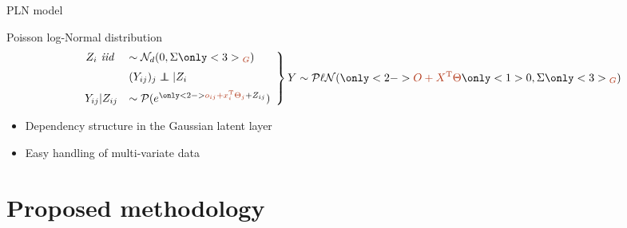 \documentclass[11pt]{beamer}
\newcommand{\emphase}[1]{\textcolor{Complement}{#1}}
\newcommand\independent{\protect\mathpalette{\protect\independenT}{\perp}}\def\independenT#1#2{\mathrel{\rlap{$#1#2$}\mkern2mu{#1#2}}}
\begin{document}

\begin{frame}{PLN model }
\begin{block}{Poisson log-Normal distribution \citep{AiH89}}
\[
            \left.
                \begin{array}{rl}
               \vspace{0.2cm}    Z_i \textit{ iid } &\sim \mathcal{N}_{d}(0,\Sigma\only<3>{\emphase{_G}})\\
              \vspace{0.2cm}    &(Y_{ij})_j \independent |Z_i\\
                    Y_{ij}|Z_{ij} &\sim \mathcal{P}(e^{\only<2->{\emphase{o_{ij}+x_i^{\text{T}}\Theta_j} +}Z_{ij}}) 
                   
                \end{array}
            \right \} Y \sim \mathcal{P\ell N}(\only<2->{\emphase{O+X^{\text{T}}\Theta }}\only<1>{0}, \Sigma\only<3>{\emphase{_G}})  
            \]
\end{block}

\begin{itemize}
    \item Dependency structure in the Gaussian latent layer
    \item Easy handling of multi-variate data 
\end{itemize}

\end{frame}

\section{Proposed methodology}
\end{document}
